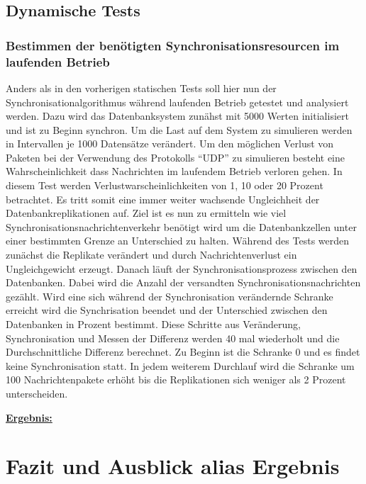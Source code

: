\documentclass[a4paper,11pt,oneside,%
headsepline,												%
footsepline,												%
bibtotocnumbered									%
]{scrreprt}
\begin{document}
\section{Dynamische Tests}
\subsection{Bestimmen der benötigten Synchronisationsresourcen im laufenden Betrieb}
Anders als in den vorherigen statischen Tests soll hier nun der Synchronisationalgorithmus während laufenden Betrieb getestet und analysiert werden. Dazu wird das Datenbanksystem zunähst mit 5000 Werten initialisiert und ist zu Beginn synchron. Um die Last auf dem System zu simulieren werden in Intervallen je 1000 Datensätze verändert. Um den möglichen Verlust von Paketen bei der Verwendung des Protokolls \enquote{UDP} zu simulieren besteht eine Wahrscheinlichkeit dass Nachrichten im laufendem Betrieb verloren gehen. In diesem Test werden Verlustwarscheinlichkeiten von 1, 10 oder 20 Prozent betrachtet. Es tritt somit eine immer weiter wachsende Ungleichheit der Datenbankreplikationen auf. Ziel ist es nun zu ermitteln wie viel Synchronisationsnachrichtenverkehr benötigt wird um die Datenbankzellen unter einer bestimmten Grenze an Unterschied zu halten. Während des Tests werden zunächst die Replikate verändert und durch Nachrichtenverlust ein Ungleichgewicht erzeugt. Danach läuft der Synchronisationsprozess zwischen den Datenbanken. Dabei wird die Anzahl der versandten Synchronisationsnachrichten gezählt. Wird eine sich während der Synchronisation verändernde Schranke erreicht wird die Synchrisation beendet und der Unterschied zwischen den Datenbanken in Prozent bestimmt. Diese Schritte aus Veränderung, Synchronisation und Messen der Differenz werden 40 mal wiederholt und die Durchschnittliche Differenz berechnet. Zu Beginn ist die Schranke 0 und es findet keine Synchronisation statt. In jedem weiterem Durchlauf wird die Schranke um 100 Nachrichtenpakete erhöht bis die Replikationen sich weniger als 2 Prozent unterscheiden.

\underline{{\bf Ergebnis:}}
\chapter{Fazit und Ausblick alias Ergebnis}
\end{document}
